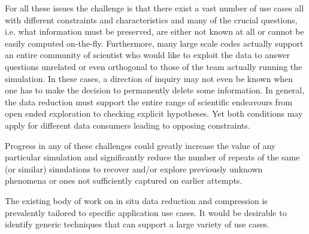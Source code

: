 \begin{refsection}
For all these issues the challenge is that there exist a vast number of use cases all with different constraints and characteristics and many of the crucial questions, i.e. what information must be preserved, are either not known at all or cannot be easily computed on-the-fly. Furthermore, many large scale codes actually support an entire community of scientist who would like to exploit the data to answer questions unrelated or even orthogonal to those of the team actually running the simulation. In these cases, a direction of inquiry may not even be known when one has to make the decision to permanently delete some information. In general, the data reduction must support the entire range of scientific endeavours from open ended exploration to checking explicit hypotheses. Yet both conditions may apply for different data consumers leading to opposing constraints.

Progress in any of these challenges could greatly increase the value of any particular simulation and significantly reduce the number of repeats of the same (or similar) simulations to recover and/or explore previously unknown phenomena or ones not sufficiently captured on earlier attempts. 

The existing body of work on in situ data reduction and compression is prevalently tailored to specific application use cases. It would be desirable to identify generic techniques that can support a large variety of use cases.


\printbibliography[heading=bibliography]
\end{refsection}

